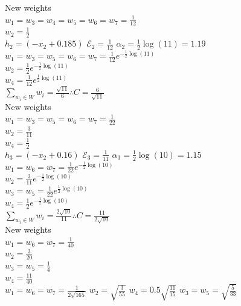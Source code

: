 \documentclass{article}
\begin{document}
\begin{enumerate}
		New weights\\
		$w_1=w_3=w_4=w_5=w_6=w_7=\frac{1}{12} $\\
		$w_2=\frac{1}{2}$\\
		\makebox[\linewidth]{\rule{\textwidth}{0.4pt}}
		$h_2 = (-x_2 + 0.185)$ \hfill $\mathcal{E}_2 = \frac{1}{12}$ \hfill $\alpha_2 = \frac{1}{2} \log \left(11\right) = 1.19$\\
		
		$w_1=w_3=w_5=w_6=w_7=\frac{1}{12}e^{-\frac{1}{2} \log \left(11\right)}$\\
		$w_2=\frac{1}{2}e^{-\frac{1}{2} \log \left(11\right)}$\\
		$w_4=\frac{1}{12}e^{\frac{1}{2} \log \left(11\right)}$\\
		
		$\displaystyle\sum_{w_i \in W}{w_i} = \frac{\sqrt{11}}{6} \therefore C=\frac{6}{\sqrt{11}}$\\
		
		New weights\\
		$w_1=w_3=w_5=w_6=w_7=\frac{1}{22} $\\
		$w_2=\frac{3}{11}$\\
		$w_4=\frac{1}{2}$\\
		\makebox[\linewidth]{\rule{\textwidth}{0.4pt}}
		$h_3 = (-x_2 + 0.16)$ \hfill $\mathcal{E}_3 = \frac{1}{11}$ \hfill $\alpha_3 = \frac{1}{2} \log \left(10\right) = 1.15$\\
		
		$w_1=w_6=w_7=\frac{1}{22}e^{-\frac{1}{2} \log \left(10\right)}$\\
		$w_2=\frac{3}{11}e^{-\frac{1}{2} \log \left(10\right)}$\\
		$w_3=w_5=\frac{1}{22}e^{\frac{1}{2} \log \left(10\right)}$\\
		$w_4=\frac{1}{2}e^{-\frac{1}{2} \log \left(10\right)}$\\
		
		$\displaystyle\sum_{w_i \in W}{w_i} = \frac{2\sqrt{10}}{11} \therefore C=\frac{11}{2\sqrt{10}}$\\
		
		New weights\\
		$w_1=w_6=w_7=\frac{1}{40} $\\
		$w_2=\frac{3}{20}$\\
		$w_3=w_5=\frac{1}{4}$\\
		$w_4=\frac{11}{40}$\\
		\makebox[\linewidth]{\rule{\textwidth}{0.4pt}}
		$w_1=w_6=w_7=\frac{1}{2\sqrt{165}}$ \hfill $w_2=\sqrt{\frac{3}{55}}$ \hfill  $w_4=0.5\sqrt{\frac{11}{15}}$ \hfill  $w_3=w_5=\sqrt{\frac{5}{33}}$ \\
		

\end{enumerate}
\end{document}

